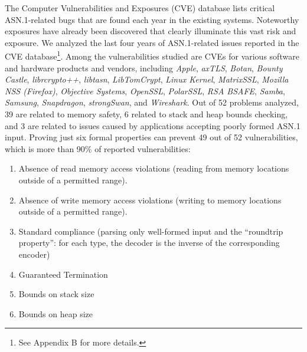 \documentclass[10p,conference]{IEEEtran}
\begin{document}
The Computer Vulnerabilities and Exposures (CVE) database \cite{CVE}
lists critical ASN.1-related bugs that are found each year in the existing
systems. Noteworthy exposures have already been discovered 
\cite{OpenSSLMemoryCorruption} that clearly illuminate this vast risk and exposure. We analyzed the last four years of
ASN.1-related issues reported in the CVE database\footnote{See Appendix B for more details.}.
Among the vulnerabilities studied
are CVEs for various software and hardware products and vendors,
including \textit{Apple}, \textit{axTLS}, \textit{Botan},
\textit{Bounty Castle}, \textit{librcrypto++}, \textit{libtasn},
\textit{LibTomCrypt}, \textit{Linux Kernel}, \textit{MatrixSSL},
\textit{Mozilla NSS (Firefox)}, \textit{Objective Systems},
\textit{OpenSSL}, \textit{PolarSSL}, \textit{RSA BSAFE},
\textit{Samba}, \textit{Samsung}, \textit{Snapdragon},
\textit{strongSwan}, and \textit{Wireshark}. 
Out of 52 problems analyzed, 39 are related to memory safety, 6 related to
stack and heap bounds checking, and 3 are related to issues caused by
applications accepting poorly formed ASN.1 input. Proving just
six formal properties can prevent 49 out of 52
vulnerabilities, which is more than 90\% of reported
vulnerabilities:

\begin{enumerate}

\item Absence of read memory access violations (reading from memory locations outside of a permitted range).
\item Absence of write memory access violations (writing to memory locations outside of a permitted range).
\item Standard compliance (parsing only well-formed input and the ``roundtrip property'': for each type, the decoder is the inverse of the corresponding encoder)
\item Guaranteed Termination
\item Bounds on stack size
\item Bounds on heap size
\end{enumerate}
\end{document}
